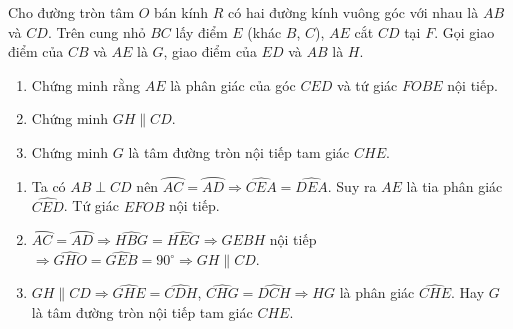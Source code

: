 \begin{ex}%
    Cho đường tròn tâm $O$ bán kính $R$ có hai đường kính vuông góc với nhau là $AB$ và $CD$. Trên cung nhỏ $BC$ lấy điểm $E$ (khác $B$, $C$), $AE$ cắt $CD$ tại $F$. Gọi giao điểm của $CB$ và $AE$ là $G$, giao điểm của $ED$ và $AB$ là $H$.
    \begin{enumerate}
        \item Chứng minh rằng $AE$ là phân giác của góc $CED$ và tứ giác $FOBE$ nội tiếp.
        \item Chứng minh $GH\parallel CD$.
        \item Chứng minh $G$ là tâm đường tròn nội tiếp tam giác $CHE$.
    \end{enumerate}
\loigiai
    {
    \begin{center}
    \end{center}
    \begin{enumerate}
        \item Ta có $AB\perp CD$ nên $\wideparen{AC}=\wideparen{AD}\Rightarrow\widehat{CEA}=\widehat{DEA}$. Suy ra $AE$ là tia phân giác $\widehat{CED}$. Tứ giác $EFOB$ nội tiếp.
        \item $\wideparen{AC}=\wideparen{AD}\Rightarrow\widehat{HBG}=\widehat{HEG}\Rightarrow GEBH$ nội tiếp $\Rightarrow\widehat{GHO}=\widehat{GEB}=90^\circ\Rightarrow GH\parallel CD.$
        \item $GH\parallel CD\Rightarrow\widehat{GHE}=\widehat{CDH}$, $\widehat{CHG}=\widehat{DCH}\Rightarrow HG$ là phân giác $\widehat{CHE}$. Hay $G$ là tâm đường tròn nội tiếp tam giác $CHE$.
    \end{enumerate}
    }
\end{ex}

